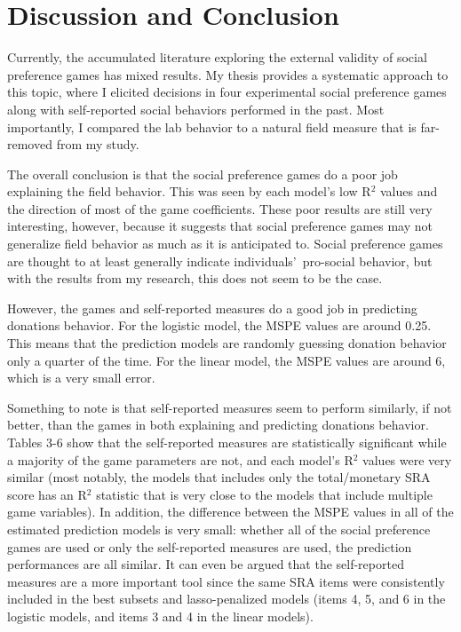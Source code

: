 \documentclass[12pt]{article}
\begin{document}
\section{Discussion and Conclusion}

Currently, the accumulated literature exploring the external validity of social preference games has mixed results. My thesis provides a systematic approach to this topic, where I elicited decisions in four experimental social preference games along with self-reported social behaviors performed in the past. Most importantly, I compared the lab behavior to a natural field measure that is far-removed from my study.

The overall conclusion is that the social preference games do a poor job explaining the field behavior. This was seen by each model\rq s low R$^{2}$ values and the direction of most of the game coefficients. These poor results are still very interesting, however, because it suggests that social preference games may not generalize field behavior as much as it is anticipated to. Social preference games are thought to at least generally indicate individuals\rq \ pro-social behavior, but with the results from my research, this does not seem to be the case.

However, the games and self-reported measures do a good job in predicting donations behavior. For the logistic model, the MSPE values are around 0.25. This means that the prediction models are randomly guessing donation behavior only a quarter of the time. For the linear model, the MSPE values are around 6, which is a very small error. 

Something to note is that self-reported measures seem to perform similarly, if not better, than the games in both explaining and predicting donations behavior. Tables 3-6 show that the self-reported measures are statistically significant while a majority of the game parameters are not, and each model\rq s R$^{2}$ values were very similar (most notably, the models that includes only the total/monetary SRA score has an R$^{2}$ statistic that is very close to the models that include multiple game variables). In addition, the difference between the MSPE values in all of the estimated prediction models is very small: whether all of the social preference games are used or only the self-reported measures are used, the prediction performances are all similar. It can even be argued that the self-reported measures are a more important tool since the same SRA items were consistently included in the best subsets and lasso-penalized models (items 4, 5, and 6 in the logistic models, and items 3 and 4 in the linear models).
\end{document}
